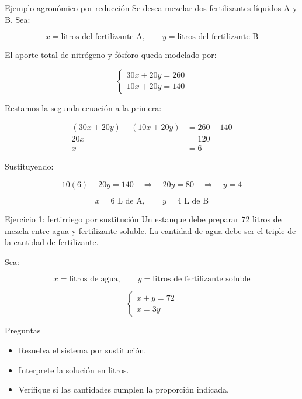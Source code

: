 \documentclass[aspectratio=169]{beamer}
\begin{document}
\begin{frame}{Ejemplo agronómico por reducción}
	\small
	Se desea mezclar dos fertilizantes líquidos A y B. Sea:
	
	\[
	x=\text{litros del fertilizante A}, \qquad y=\text{litros del fertilizante B}
	\]
	
	El aporte total de nitrógeno y fósforo queda modelado por:
	
	\[
	\begin{cases}
		30x+20y=260\\
		10x+20y=140
	\end{cases}
	\]
	
	Restamos la segunda ecuación a la primera:
	
	\begin{align*}
	(30x+20y)-(10x+20y)&=260-140\\
	20x&=120\\
	x&=6
	\end{align*}
	
	Sustituyendo:
	
	\[
	10(6)+20y=140\quad \Rightarrow\quad 20y=80\quad \Rightarrow\quad y=4
	\]
	
	\[
	\boxed{x=6\text{ L de A},\qquad y=4\text{ L de B}}
	\]
\end{frame}
	
\begin{frame}{Ejercicio 1: fertirriego por sustitución}
	\small
	Un estanque debe preparar \(72\) litros de mezcla entre agua y fertilizante soluble. La cantidad de agua debe ser el triple de la cantidad de fertilizante.
	
	\bigskip
	
	Sea:
	
	\[
	x=\text{litros de agua}, \qquad y=\text{litros de fertilizante soluble}
	\]
	
	\[
	\begin{cases}
		x+y=72\\
		x=3y
	\end{cases}
	\]
	
	\begin{block}{Preguntas}
		\begin{itemize}
			\item Resuelva el sistema por sustitución.
			\item Interprete la solución en litros.
			\item Verifique si las cantidades cumplen la proporción indicada.
		\end{itemize}
	\end{block}
\end{frame}
	
\end{document}
